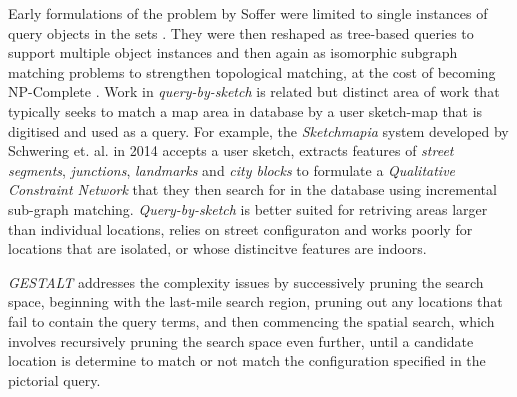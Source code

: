 {Early formulations of the problem by Soffer were limited to single instances of query objects in the sets \cite{Soffer1997} \cite{Soffer1998a}. 
They were then reshaped as tree-based queries \cite{Soffer1999} to support multiple object instances and then again as isomorphic subgraph matching problems to strengthen topological matching, at the cost of becoming NP-Complete \cite{Folkers2000}.
Work in \textit{query-by-sketch} is related but distinct area of work that typically seeks to match a map area in database by a user sketch-map that is digitised and used as a query. 
For example, the \textit{Sketchmapia} system developed by Schwering et. al. in 2014 accepts a user sketch, extracts features of \textit{street segments}, \textit{junctions}, \textit{landmarks} and \textit{city blocks} to formulate a \textit{Qualitative Constraint Network} that they then search for in the database using incremental sub-graph matching. 
\textit{Query-by-sketch} is better suited for retriving areas larger than individual locations, relies on street configuraton and works poorly for locations that are isolated, or whose distincitve features are indoors. 

\textit{GESTALT} addresses the complexity issues by successively pruning the search space, beginning with the last-mile search region, pruning out any locations that fail to contain the query terms, and then commencing the spatial search, which involves recursively pruning the search space even further, until a candidate location is determine to match or not match the configuration specified in the pictorial query.}



